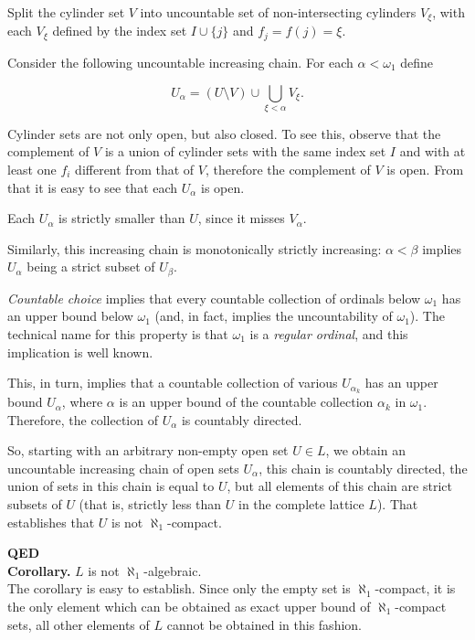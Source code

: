 \documentclass{article}
\begin{document}
Split the cylinder set $V$ into uncountable set of non-intersecting cylinders $V_\xi$, with each $V_\xi$ defined by
the index set $I \cup \{j\}$ and $f_j = f(j) = \xi$. 

Consider the following uncountable increasing chain. For each $\alpha<\omega_1$ define

$$
U_\alpha=(U\setminus V)\cup\bigcup_{\xi<\alpha}V_\xi.
$$

Cylinder sets are not only open, but also closed. To see this, observe that the complement of $V$ is a union of cylinder sets with
the same index set $I$ and with at least one $f_i$ different from that of $V$, therefore the complement of $V$ is open. From that it is
easy to see that each $U_\alpha$ is open.

Each $U_\alpha$ is strictly smaller than $U$, since it misses $V_\alpha$.

Similarly, this increasing chain is monotonically strictly increasing: $\alpha < \beta$ implies $U_\alpha$ being a strict subset of $U_\beta$.

{\em Countable choice} implies that every countable collection of ordinals below $\omega_1$ has an upper bound below $\omega_1$ (and, in fact,
implies the uncountability of $\omega_1$). The technical name for this property is that  $\omega_1$ is a {\em regular ordinal}, and this implication
is well known.

This, in turn, implies that a countable collection of various $U_{\alpha_k}$ has an upper bound $U_\alpha$, where $\alpha$ 
is an upper bound of the countable collection $\alpha_k$ in $\omega_1$. Therefore, the collection of $U_\alpha$ is countably directed.

So, starting with an arbitrary non-empty open set $U \in L$, we obtain an uncountable increasing chain of open sets $U_\alpha$, this chain
is countably directed, the union of sets in this chain is equal to $U$, but all elements of this chain are
strict subsets of $U$ (that is, strictly less than $U$ in the complete lattice $L$). That establishes that $U$ is not $\aleph_1$-compact.

{\bf QED}\\

{\bf Corollary.} $L$ is not $\aleph_1$-algebraic.\\

The corollary is easy to establish. Since only the empty set is $\aleph_1$-compact, it is the only element which can be
obtained as exact upper bound of $\aleph_1$-compact sets, all other elements of $L$ cannot be obtained in this fashion.
\end{document}
